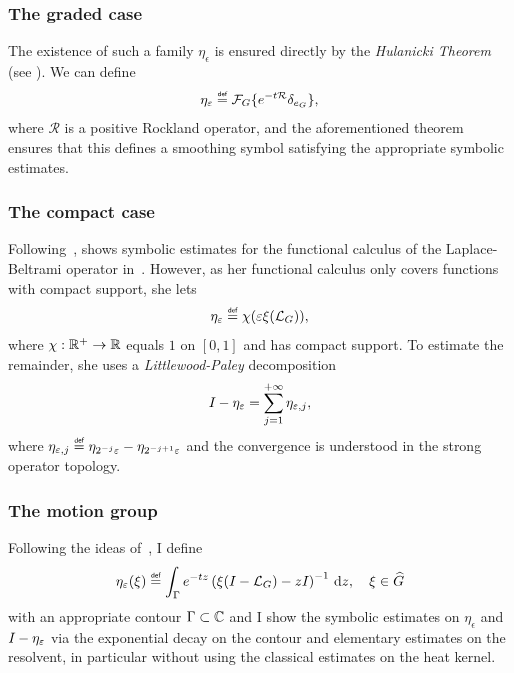 \subsubsection{The graded case}

The existence of such a family $\eta_\epsilon$ is ensured directly by the \emph{Hulanicki Theorem} (see \cite[Theorem 4.5.1]{FischerRuzhansky16}).
We can define
\begin{align*}
    \eta_\epsilon \defeq \Fourier \{\e^{-t \mathcal R} \delta_{e_\Group}\},
\end{align*}
where $\mathcal R$ is a positive Rockland operator,
and the aforementioned theorem ensures that this defines a smoothing symbol satisfying the appropriate symbolic estimates.

\subsubsection{The compact case}

Following~\cite{FurioliMelziVeneruso06},
\citeauthor{Fischer2015} shows symbolic estimates for the functional calculus of the Laplace-Beltrami operator in~\cite{Fischer2015}.
However, as her functional calculus only covers functions with compact support,
she lets
\begin{align*}
    \eta_\epsilon
    \defeq \chi(\epsilon \xi(\Laplacian [\Group])),
\end{align*}
where $\chi : \mathbb{R}^+ \to \mathbb{R}$ equals $1$ on $[0, 1]$ and has compact support.
To estimate the remainder,
she uses a \emph{Littlewood-Paley} decomposition
\begin{align*}
    {I_{}} - \eta_\varepsilon = \sum_{j = 1}^{+\infty} \eta_{\varepsilon, j},
\end{align*}
where $\eta_{\epsilon, j} \defeq \eta_{2^{-j} \epsilon} - \eta_{2^{-j + 1} \epsilon}$
and the convergence is understood in the strong operator topology.

\subsubsection{The motion group}

Following the ideas of~\cite{Shubin01, RuzhanskyWirth14},
I define
\begin{align*}
    \eta_\epsilon(\xi) \defeq
    \int_\Gamma \e^{-t z} \left(\xi(\Id {} - \Laplacian) - z \Id {}\right)^{-1} \dd z,
    \quad \xi \in \dualGroup \Group
\end{align*}
with an appropriate contour $\Gamma \subset \mathbb{C}$
and I show the symbolic estimates on $\eta_\epsilon$ and ${I_{}} - \eta_\varepsilon$
via the exponential decay on the contour and elementary estimates on the resolvent,
in particular without using the classical estimates on the heat kernel.

